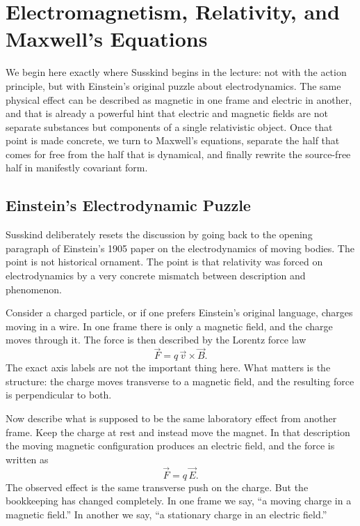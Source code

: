 \chapter{Electromagnetism, Relativity, and Maxwell's Equations}

We begin here exactly where Susskind begins in the lecture: not with the action principle, but with Einstein's original puzzle about electrodynamics. The same physical effect can be described as magnetic in one frame and electric in another, and that is already a powerful hint that electric and magnetic fields are not separate substances but components of a single relativistic object. Once that point is made concrete, we turn to Maxwell's equations, separate the half that comes for free from the half that is dynamical, and finally rewrite the source-free half in manifestly covariant form.

\section{Einstein's Electrodynamic Puzzle}

Susskind deliberately resets the discussion by going back to the opening paragraph of Einstein's 1905 paper on the electrodynamics of moving bodies. The point is not historical ornament. The point is that relativity was forced on electrodynamics by a very concrete mismatch between description and phenomenon.

Consider a charged particle, or if one prefers Einstein's original language, charges moving in a wire. In one frame there is only a magnetic field, and the charge moves through it. The force is then described by the Lorentz force law
\begin{equation}
\vec F = q\,\vec v \times \vec B.
\end{equation}
The exact axis labels are not the important thing here. What matters is the structure: the charge moves transverse to a magnetic field, and the resulting force is perpendicular to both.

Now describe what is supposed to be the same laboratory effect from another frame. Keep the charge at rest and instead move the magnet. In that description the moving magnetic configuration produces an electric field, and the force is written as
\begin{equation}
\vec F = q\,\vec E.
\end{equation}
The observed effect is the same transverse push on the charge. But the bookkeeping has changed completely. In one frame we say, ``a moving charge in a magnetic field.'' In another we say, ``a stationary charge in an electric field.''

